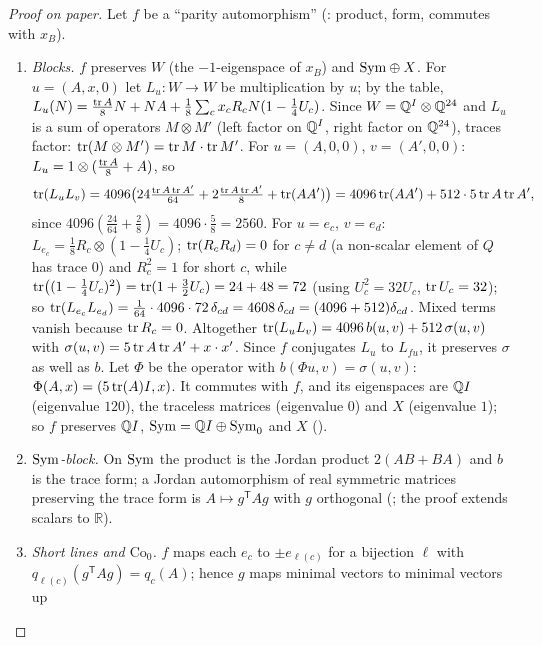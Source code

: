 \begin{proof}[Proof on paper]
Let $f$ be a ``parity automorphism'' (: product, form, commutes with $x_B$).
\begin{enumerate}[label=(\alph*)]
\item \emph{Blocks.}  $f$ preserves $W$ (the $-1$-eigenspace of $x_B$) and $\mathrm{Sym}\oplus X$.  For
  $u=(A,x,0)$ let $L_u:W\to W$ be multiplication by $u$; by the table,
  $L_u(N)=\tfrac{\operatorname{tr} A}8N+NA+\tfrac18\sum_cx_cR_cN(1-\tfrac14U_c)$.  Since $W={\mathbb{Q}}^I\otimes{\mathbb{Q}}^{24}$ and $L_u$ is
  a sum of operators $M\otimes M'$ (left factor on ${\mathbb{Q}}^I$, right factor on ${\mathbb{Q}}^{24}$), traces factor:
  $\operatorname{tr}(M\otimes M')=\operatorname{tr} M\cdot\operatorname{tr} M'$.  For $u=(A,0,0)$, $v=(A',0,0)$: $L_u=1\otimes(\tfrac{\operatorname{tr} A}8+A)$, so
  \begin{equation*}
    \operatorname{tr}(L_uL_v)=4096\bigl(24\tfrac{\operatorname{tr} A\operatorname{tr} A'}{64}+2\tfrac{\operatorname{tr} A\operatorname{tr} A'}8+\operatorname{tr}(AA')\bigr)
    =4096\operatorname{tr}(AA')+512\cdot5\operatorname{tr} A\operatorname{tr} A',
  \end{equation*}
  since $4096(\tfrac{24}{64}+\tfrac28)=4096\cdot\tfrac58=2560$.  For $u=e_c$, $v=e_d$:
  $L_{e_c}=\tfrac18R_c\otimes(1-\tfrac14U_c)$; $\operatorname{tr}(R_cR_d)=0$ for $c\neq d$ (a non-scalar element of $Q$
  has trace $0$) and $R_c^2=1$ for short $c$, while
  $\operatorname{tr}\bigl((1-\tfrac14U_c)^2\bigr)=\operatorname{tr}(1+\tfrac32U_c)=24+48=72$ (using $U_c^2=32U_c$, $\operatorname{tr} U_c=32$); so
  $\operatorname{tr}(L_{e_c}L_{e_d})=\tfrac1{64}\cdot4096\cdot72\,\delta_{cd}=4608\,\delta_{cd}=(4096+512)\delta_{cd}$.  Mixed
  terms vanish because $\operatorname{tr} R_c=0$.  Altogether
  $\operatorname{tr}(L_uL_v)=4096\,b(u,v)+512\,\sigma(u,v)$ with $\sigma(u,v)=5\operatorname{tr} A\operatorname{tr} A'+x\cdot x'$.  Since $f$ conjugates
  $L_u$ to $L_{fu}$, it preserves $\sigma$ as well as $b$.  Let $\Phi$ be the operator with
  $b(\Phi u,v)=\sigma(u,v)$: $\Phi(A,x)=(5\operatorname{tr}(A)I,x)$.  It commutes with $f$, and its eigenspaces are
  ${\mathbb{Q}} I$ (eigenvalue $120$), the traceless matrices (eigenvalue $0$) and $X$ (eigenvalue $1$); so $f$
  preserves ${\mathbb{Q}} I$, $\mathrm{Sym}={\mathbb{Q}} I\oplus\mathrm{Sym}_0$ and $X$ ().
\item \emph{$\mathrm{Sym}$-block.}  On $\mathrm{Sym}$ the product is the Jordan product $2(AB+BA)$ and $b$ is the trace form;
  a Jordan automorphism of real symmetric matrices preserving the trace form is $A\mapsto g^{\mathsf T}Ag$
  with $g$ orthogonal (; the proof extends scalars to $\mathbb{R}$).
\item \emph{Short lines and $\mathrm{Co}_0$.}  $f$ maps each $e_c$ to $\pm e_{\ell(c)}$ for a bijection
  $\ell$ with $q_{\ell(c)}(g^{\mathsf T}Ag)=q_c(A)$; hence $g$ maps minimal vectors to minimal vectors up

\end{enumerate}
\end{proof}
